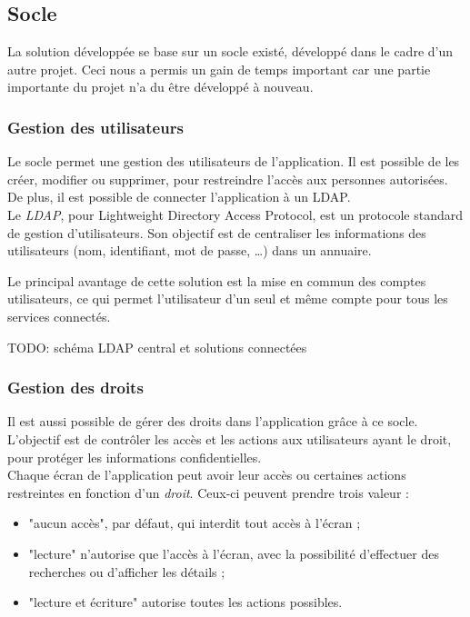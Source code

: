 
\subsection{Socle}

La solution développée se base sur un socle existé, développé dans le cadre d'un autre projet. Ceci nous a permis un gain de temps important car une partie importante du projet n'a du être développé à nouveau.

\subsubsection{Gestion des utilisateurs}

Le socle permet une gestion des utilisateurs de l'application. Il est possible de les créer, modifier ou supprimer, pour restreindre l'accès aux personnes autorisées. De plus, il est possible de connecter l'application à un LDAP.
\\

Le \textit{LDAP}, pour Lightweight Directory Access Protocol, est un protocole standard de gestion d'utilisateurs. Son objectif est de centraliser les informations des utilisateurs (nom, identifiant, mot de passe, \ldots) dans un annuaire.

Le principal avantage de cette solution est la mise en commun des comptes utilisateurs, ce qui permet l'utilisateur d'un seul et même compte pour tous les services connectés.

TODO: schéma LDAP central et solutions connectées

\subsubsection{Gestion des droits}

Il est aussi possible de gérer des droits dans l'application grâce à ce socle. L'objectif est de contrôler les accès et les actions aux utilisateurs ayant le droit, pour protéger les informations confidentielles.
\\

Chaque écran de l'application peut avoir leur accès ou certaines actions restreintes en fonction d'un \textit{droit}. Ceux-ci peuvent prendre trois valeur : 
\begin{itemize}
  \item "aucun accès", par défaut, qui interdit tout accès à l'écran ;
  \item "lecture" n'autorise que l'accès à l'écran, avec la possibilité d'effectuer des recherches ou d'afficher les détails ;
  \item "lecture et écriture" autorise toutes les actions possibles.
\end{itemize}


